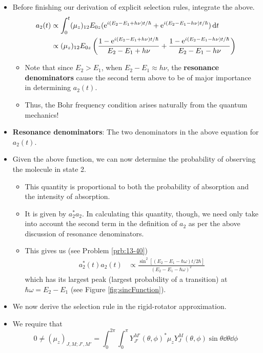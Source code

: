 \documentclass[../notes.tex]{subfiles}
\begin{document}
\begin{itemize}
    \item Before finishing our derivation of explicit selection rules, integrate the above.
    \begin{align*}
        a_2(t) &\propto \int_0^t(\mu_z)_{12}E_{0z}(\e[i(E_2-E_1+h\nu)t/\hbar]+\e[i(E_2-E_1-h\nu)t/\hbar])\dd{t}\\
        &\propto (\mu_z)_{12}E_{0z}\left( \frac{1-\e[i(E_2-E_1+h\nu)t/\hbar]}{E_2-E_1+h\nu}+\frac{1-\e[i(E_2-E_1-h\nu)t/\hbar]}{E_2-E_1-h\nu} \right)
    \end{align*}
    \begin{itemize}
        \item Note that since $E_2>E_1$, when $E_2-E_1\approx h\nu$, the \textbf{resonance denominators} cause the second term above to be of major importance in determining $a_2(t)$.
        \item Thus, the Bohr frequency condition arises naturally from the quantum mechanics!
    \end{itemize}
    \item \textbf{Resonance denominators}: The two denominators in the above equation for $a_2(t)$.
    \item Given the above function, we can now determine the probability of observing the molecule in state 2.
    \begin{itemize}
        \item This quantity is proportional to both the probability of absorption and the intensity of absorption.
        \item It is given by $a_2^*a_2$. In calculating this quantity, though, we need only take into account the second term in the definition of $a_2$ as per the above discussion of resonance denominators.
        \item This gives us (see Problem \ref{prb:13-40})
        \begin{align*}
            a_2^*(t)a_2(t) &\propto \frac{\sin^2[(E_2-E_1-\hbar\omega)t/2\hbar]}{(E_2-E_1-\hbar\omega)^2}
        \end{align*}
        which has its largest peak (largest probability of a transition) at $\hbar\omega=E_2-E_1$ (see Figure \ref{fig:sincFunction}).
    \end{itemize}
    \item We now derive the selection rule in the rigid-rotator approximation.
    \item We require that
    \begin{equation*}
        0 \neq (\mu_z)_{J,M;J',M'} = \int_0^{2\pi}\int_0^\pi Y_{J'}^{M'}(\theta,\phi)^*\mu_zY_J^M(\theta,\phi)\sin\theta\dd{\theta}\dd{\phi}

\end{equation*}
\end{itemize}
\end{document}
